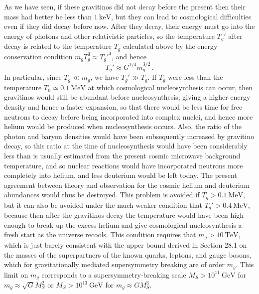 As we have seen, if these gravitinos did not decay before the present then
their mass had better be less than \(1\ \mathrm{keV}\), but they can lead
to cosmological difficulties even if they did decay before now. After they
decay, their energy must go into the energy of photons and other
relativistic particles, so the temperature \(T_g'\) after decay is related
to the temperature \(T_g\) calculated above by the energy conservation
condition \(m_gT_g^3\approx T_g'^4\), and hence
\[
  T_g'\approx G^{1/4}m_g^{3/2}\,.
\]
In particular, since \(T_g\ll m_g\), we have \(T_g'\gg T_g\). If \(T_g\)
were less than the temperature \(T_n\simeq0.1\ \mathrm{MeV}\) at which
cosmological nucleosynthesis can occur, then gravitinos would still be
abundant before nucleosynthesis, giving a higher energy density and hence a
faster expansion, so that there would be less time for free neutrons to
decay before being incorporated into complex nuclei, and hence more helium
would be produced when nucleosynthesis occurs. Also, the ratio of the
photon and baryon densities would have been subsequently increased by
gravitino decay, so this ratio at the time of nucleosynthesis would have
been considerably less than is usually estimated from the present cosmic
microwave background temperature, and so nuclear reactions would have
incorporated neutrons more completely into helium, and less deuterium would
be left today. The present agreement between theory and observation for the
cosmic helium and deuterium abundances would thus be destroyed. This
problem is avoided if \(T_g>0.1\ \mathrm{MeV}\), but it can also be avoided
under the much weaker condition that \(T_g'>0.4\ \mathrm{MeV}\), because
then after the gravitinos decay the temperature would have been high enough
to break up the excess helium and give cosmological nucleosynthesis a fresh
start as the universe recools. This condition requires that
\(m_g>10\ \mathrm{TeV}\), which is just barely consistent with the upper
bound derived in Section 28.1 on the masses of the superpartners of the
known quarks, leptons, and gauge bosons, which for gravitationally mediated
supersymmetry breaking are of order \(m_g\). This limit on \(m_g\)
corresponds to a supersymmetry-breaking scale
\(M_S>10^{11}\ \mathrm{GeV}\) for \(m_g\approx\sqrt{G}M_S^2\) or
\(M_S>10^{13}\ \mathrm{GeV}\) for \(m_g\approx GM_S^3\).
